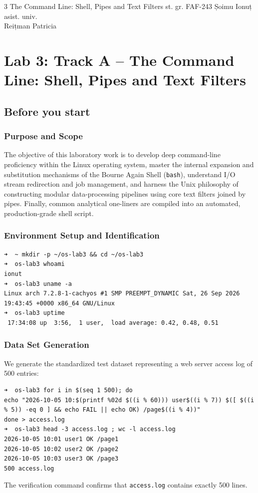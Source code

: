 \documentclass{labreport}
\begin{document}
\labtitle
    {3}
    {The Command Line: Shell, Pipes and Text Filters}
    {st. gr. FAF-243}
    {Șoimu Ionuț}
    {asist. univ.\\[0.15cm] Reițman Patricia}

\tableofcontents
\newpage

\section{Lab 3: Track A -- The Command Line: Shell, Pipes and Text Filters}

\subsection{Before you start}

\subsubsection*{Purpose and Scope}
The objective of this laboratory work is to develop deep command-line proficiency within the Linux operating system, master the internal expansion and substitution mechanisms of the Bourne Again Shell (\texttt{bash}), understand I/O stream redirection and job management, and harness the Unix philosophy of constructing modular data-processing pipelines using core text filters joined by pipes. Finally, common analytical one-liners are compiled into an automated, production-grade shell script.

\subsubsection*{Environment Setup and Identification}
\begin{lstlisting}[style=bash]
➜  ~ mkdir -p ~/os-lab3 && cd ~/os-lab3
➜  os-lab3 whoami
ionut
➜  os-lab3 uname -a
Linux arch 7.2.8-1-cachyos #1 SMP PREEMPT_DYNAMIC Sat, 26 Sep 2026 19:43:45 +0000 x86_64 GNU/Linux
➜  os-lab3 uptime
 17:34:08 up  3:56,  1 user,  load average: 0.42, 0.48, 0.51
\end{lstlisting}

\subsubsection*{Data Set Generation}
We generate the standardized test dataset representing a web server access log of 500 entries:
\begin{lstlisting}[style=bash]
➜  os-lab3 for i in $(seq 1 500); do
echo "2026-10-05 10:$(printf %02d $((i % 60))) user$((i % 7)) $([ $((i % 5)) -eq 0 ] && echo FAIL || echo OK) /page$((i % 4))"
done > access.log
➜  os-lab3 head -3 access.log ; wc -l access.log
2026-10-05 10:01 user1 OK /page1
2026-10-05 10:02 user2 OK /page2
2026-10-05 10:03 user3 OK /page3
500 access.log
\end{lstlisting}
The verification command confirms that \texttt{access.log} contains exactly 500 lines.
\end{document}
